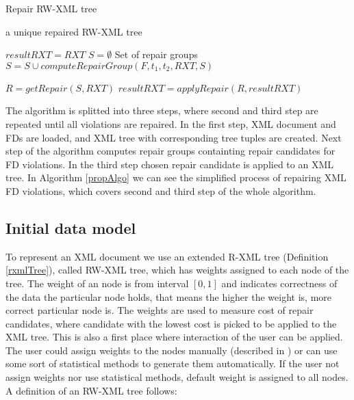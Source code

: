 \begin{algorithm}
\caption{Repair RW-XML tree}
\label{propAlgo}
\begin{algorithmic}[1]
\ENSURE a unique repaired RW-XML tree

\STATE $resultRXT = RXT$
    \STATE $S = \emptyset$ \COMMENT Set of repair groups
		    \STATE $S = S \cup computeRepairGroup(F, t_1, t_2, RXT, S)$
	    \ENDFOR
    \ENDFOR

    \STATE $R = getRepair(S, RXT)$
    \STATE $resultRXT = applyRepair(R, resultRXT)$
\ENDWHILE

\end{algorithmic}
\end{algorithm}

The algorithm is splitted into three steps, where second and third step are repeated until all violations are repaired. In the first step, XML document and FDs are loaded, and XML tree with corresponding tree tuples are created. Next step of the algorithm computes repair groups containting repair candidates for FD violations. In the third step chosen repair candidate is applied to an XML tree. In Algorithm \ref{propAlgo} we can see the simplified process of repairing XML FD violations, which covers second and third step of the whole algorithm.

\subsection{Initial data model}

To represent an XML document we use an extended R-XML tree (Definition \ref{rxmlTree}), called RW-XML tree, which has weights assigned to each node of the tree. The weight of an node is from interval $[0,1]$ and indicates correctness of the data the particular node holds, that means the higher the weight is, more correct particular node is. The weights are used to measure cost of repair candidates, where candidate with the lowest cost is picked to be applied to the XML tree. This is also a first place where interaction of the user can be applied. The user could assign weights to the nodes manually (described in ) or can use some sort of statistical methods to generate them automatically. If the user not assign weights nor use statistical methods, default weight is assigned to all nodes. A definition of an RW-XML tree follows:

